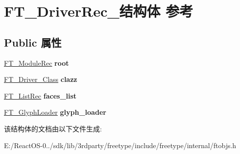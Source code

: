 \hypertarget{struct_f_t___driver_rec__}{}\section{F\+T\+\_\+\+Driver\+Rec\+\_\+结构体 参考}
\label{struct_f_t___driver_rec__}
\subsection*{Public 属性}
\begin{DoxyCompactItemize}
\item 
\mbox{\label{struct_f_t___driver_rec___a8451ceb25c76794fb47e81f477c8222d}} 
\hyperlink{struct_f_t___module_rec__}{F\+T\+\_\+\+Module\+Rec} {\bfseries root}
\item 
\mbox{\label{struct_f_t___driver_rec___a3111153608e5abeb093ed5eb7fef5aec}} 
\hyperlink{struct_f_t___driver___class_rec__}{F\+T\+\_\+\+Driver\+\_\+\+Class} {\bfseries clazz}
\item 
\mbox{\label{struct_f_t___driver_rec___a2602170e3ecde21a764dc32417aaa002}} 
\hyperlink{struct_f_t___list_rec__}{F\+T\+\_\+\+List\+Rec} {\bfseries faces\+\_\+list}
\item 
\mbox{\label{struct_f_t___driver_rec___ac28e7adbc14ee82c2b7710d0ee5541e2}} 
\hyperlink{struct_f_t___glyph_loader_rec__}{F\+T\+\_\+\+Glyph\+Loader} {\bfseries glyph\+\_\+loader}
\end{DoxyCompactItemize}


该结构体的文档由以下文件生成\+:\begin{DoxyCompactItemize}
\item 
E\+:/\+React\+O\+S-\/0../sdk/lib/3rdparty/freetype/include/freetype/internal/ftobjs.\+h\end{DoxyCompactItemize}
